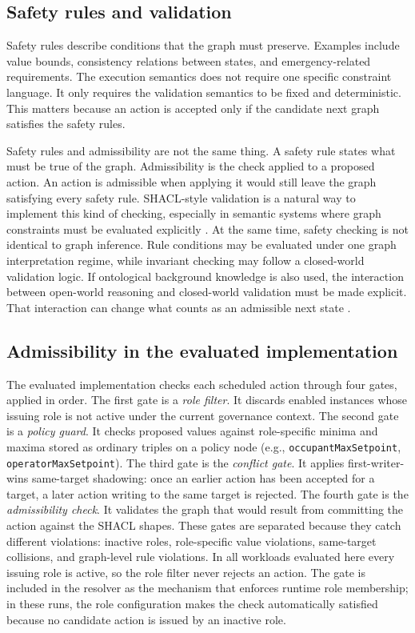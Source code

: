 \documentclass{ieeeaccess}
\theoremstyle{definition}
\theoremstyle{plain}
\theoremstyle{remark}
\begin{document}
\subsection{Safety rules and validation}

Safety rules describe conditions that the graph must preserve. Examples include value bounds, consistency relations between states, and emergency-related requirements. The execution semantics does not require one specific constraint language. It only requires the validation semantics to be fixed and deterministic. This matters because an action is accepted only if the candidate next graph satisfies the safety rules.

Safety rules and admissibility are not the same thing. A safety rule states what must be true of the graph. Admissibility is the check applied to a proposed action. An action is admissible when applying it would still leave the graph satisfying every safety rule.
SHACL-style validation is a natural way to implement this kind of checking, especially in semantic systems where graph constraints must be evaluated explicitly \cite{Corman2018RecursiveSHACL}. At the same time, safety checking is not identical to graph inference. Rule conditions may be evaluated under one graph interpretation regime, while invariant checking may follow a closed-world validation logic. If ontological background knowledge is also used, the interaction between open-world reasoning and closed-world validation must be made explicit. That interaction can change what counts as an admissible next state \cite{Oudshoorn2026SHACLValidationOntologies}.

\subsection{Admissibility in the evaluated implementation}
\label{sec:iv-gates}

The evaluated implementation checks each scheduled action through four gates, applied in order. The first gate is a \emph{role filter}. It discards enabled instances whose issuing role is not active under the current governance context. The second gate is a \emph{policy guard}. It checks proposed values against role-specific minima and maxima stored as ordinary triples on a policy node (e.g., \texttt{occupantMaxSetpoint}, \texttt{operatorMaxSetpoint}). The third gate is the \emph{conflict gate}. It applies first-writer-wins same-target shadowing: once an earlier action has been accepted for a target, a later action writing to the same target is rejected. The fourth gate is the \emph{admissibility check}. It validates the graph that would result from committing the action against the SHACL shapes. These gates are separated because they catch different violations: inactive roles, role-specific value violations, same-target collisions, and graph-level rule violations. In all workloads evaluated here every issuing role is active, so the role filter never rejects an action. The gate is included in the resolver as the mechanism that enforces runtime role membership; in these runs, the role configuration makes the check automatically satisfied because no candidate action is issued by an inactive role.
\end{document}
